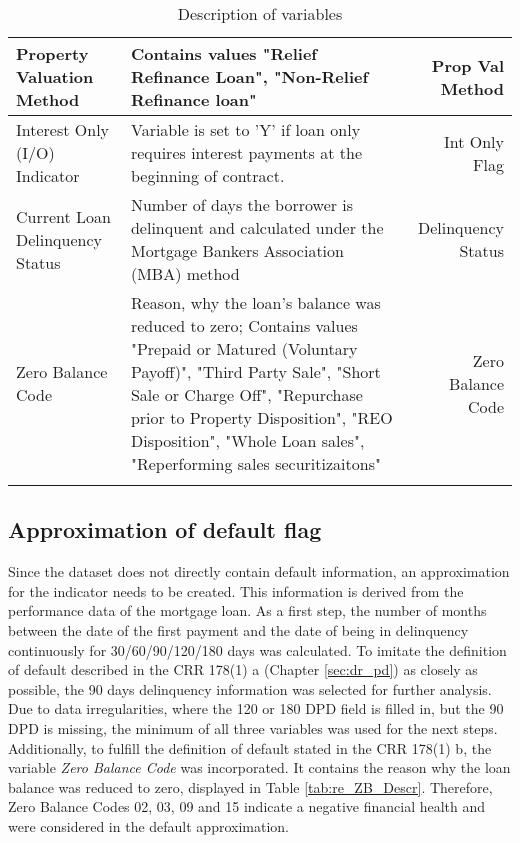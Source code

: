 \begin{longtable}{ Lp{8cm}R }
Property Valuation Method                 & Contains values "Relief Refinance Loan", "Non-Relief Refinance loan"                                                                                                                                                                                                                 & Prop Val Method    \\\hline
Interest Only (I/O) Indicator             & Variable is set to 'Y' if loan only requires interest payments at the beginning of contract.                                                                                                                                                                                         & Int Only Flag      \\\hline
Current Loan Delinquency Status           & Number of days the borrower is delinquent and calculated under the Mortgage Bankers Association (MBA) method                                                                                                                                                                         & Delinquency Status \\\hline
Zero Balance Code                         & Reason, why the loan's balance was reduced to zero; Contains values "Prepaid or Matured (Voluntary Payoff)", "Third Party Sale", "Short Sale or Charge Off", "Repurchase prior to Property Disposition", "REO Disposition", "Whole Loan sales", "Reperforming sales securitizaitons" & Zero Balance Code 
\\\bottomrule

\caption{Description of variables}
\label{tab:re_descr}
\end{longtable}

\subsection{Approximation of default flag}
\label{sec:aprox_def}

Since the dataset does not directly contain default information, an approximation for the indicator needs to be created. This information is derived from the performance data of the mortgage loan. As a first step, the number of months between the date of the first payment and the date of being in delinquency continuously for 30/60/90/120/180 days was calculated. To imitate the definition of default described in the CRR 178(1) a (Chapter \ref{sec:dr_pd}) as closely as possible, the 90 days delinquency information was selected for further analysis. Due to data irregularities, where the 120 or 180 DPD field is filled in, but the 90 DPD is missing, the minimum of all three variables was used for the next steps. Additionally, to fulfill the definition of default stated in the CRR 178(1) b, the variable \emph{Zero Balance Code} was incorporated. It contains the reason why the loan balance was reduced to zero, displayed in Table \ref{tab:re_ZB_Descr}. Therefore, Zero Balance Codes 02, 03, 09 and 15 indicate a negative financial health and were considered in the default approximation.


